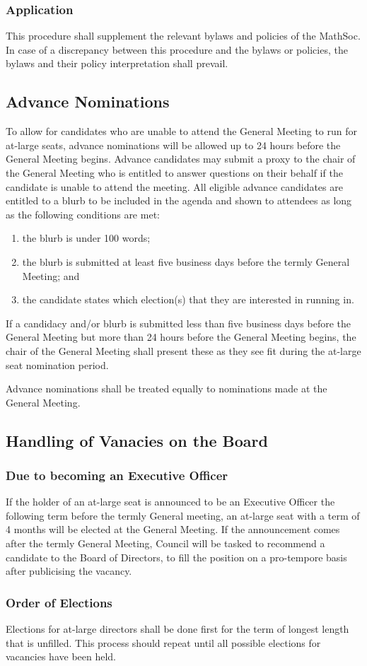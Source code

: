 \subsubsection{Application}
This procedure shall supplement the relevant bylaws and policies of the MathSoc.
In case of a discrepancy between this procedure and the bylaws or policies, the bylaws and their policy interpretation shall prevail.

\subsection{Advance Nominations}
To allow for candidates who are unable to attend the General Meeting to run for at-large seats, advance nominations will be allowed up to 24 hours before the General Meeting begins.
Advance candidates may submit a proxy to the chair of the General Meeting who is entitled to answer questions on their behalf if the candidate is unable to attend the meeting.
All eligible advance candidates are entitled to a blurb to be included in the agenda and shown to attendees as long as the following conditions are met:
\begin{enumerate}
	\item the blurb is under 100 words;
	\item the blurb is submitted at least five business days before the termly General Meeting; and
	\item the candidate states which election(s) that they are interested in running in.
\end{enumerate}
If a candidacy and/or blurb is submitted less than five business days before the General Meeting but more than 24 hours before the General Meeting begins, the chair of the General Meeting shall present these as they see fit during the at-large seat nomination period.

\noindent Advance nominations shall be treated equally to nominations made at the General Meeting.

\subsection{Handling of Vanacies on the Board}
\subsubsection{Due to becoming an Executive Officer}
If the holder of an at-large seat is announced to be an Executive Officer the following term before the termly General meeting, an at-large seat with a term of 4 months will be elected at the General Meeting.
If the announcement comes after the termly General Meeting, Council will be tasked to recommend a candidate to the Board of Directors, to fill the position on a pro-tempore basis after publicising the vacancy.

\subsubsection{Order of Elections}
Elections for at-large directors shall be done first for the term of longest length that is unfilled.
This process should repeat until all possible elections for vacancies have been held.

